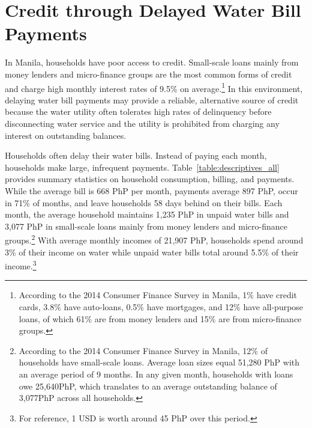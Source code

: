 \documentclass[12pt]{article}
\begin{document}
\section{Credit through Delayed Water Bill Payments}\label{section:descriptives}

In Manila, households have poor access to credit.  Small-scale loans mainly from money lenders and micro-finance groups are the most common forms of credit and charge high monthly interest rates of 9.5\unskip\% on average.\footnote{According to the 2014 Consumer Finance Survey in Manila, 1\% have credit cards, 3.8\% have auto-loans, 0.5\% have mortgages, and 12\unskip\% have all-purpose loans, of which 61\unskip\% are from money lenders and 15\unskip\% are from micro-finance groups.}  In this environment, delaying water bill payments may provide a reliable, alternative source of credit because the water utility often tolerates high rates of delinquency before disconnecting water service and the utility is prohibited from charging any interest on outstanding balances.  

Households often delay their water bills.  Instead of paying each month, households make large, infrequent payments.  Table~\ref{table:descriptives_all} provides summary statistics on household consumption, billing, and payments.  While the average bill is 668 PhP per month, payments average 897 PhP, occur in 71\unskip\% of months, and leave households 58 days behind on their bills.  Each month, the average household maintains 1,235 PhP in unpaid water bills and 3,077 PhP in small-scale loans mainly from money lenders and micro-finance groups.\footnote{According to the 2014 Consumer Finance Survey in Manila, 12\% of households have small-scale loans.  Average loan sizes equal 51,280 PhP with an average period of 9 months.  In any given month, households with loans owe 25,640PhP, which translates to an average outstanding balance of 3,077PhP across all households.}   With average monthly incomes of 21,907 PhP, households spend around 3\% of their income on water while unpaid water bills total around 5.5\% of their income.\footnote{For reference, 1 USD is worth around 45 PhP over this period.}   
\end{document}
